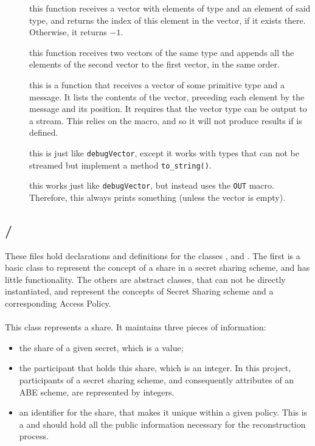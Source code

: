 \documentclass{article}
\begin{document}
\begin{description}
\item[] this function receives a vector with elements of type  and an element of said type, and returns the index of this element in the vector, if it exists there. Otherwise, it returns $-1$.
\item[] this function receives two vectors of the same type and appends all the elements of the second vector to the first vector, in the same order.
\item[] this is a function that receives a vector of some primitive type and a \cstring message. It lists the contents of the vector, preceding each element by the message and its position. It requires that the vector type can be output to a stream. This relies on the  macro, and so it will not produce results if  is defined.
\item[] this is just like \verb|debugVector|, except it works with types that can not be streamed but implement a method \verb|to_string()|. 
\item[] this works just like \verb|debugVector|, but instead uses the \verb|OUT| macro. Therefore, this always prints something (unless the vector is empty).
\end{description}

\subsection{\fhss / \fcss}

These files hold declarations and definitions for the classes \cST, \cAP and \cSS. The first is a basic class to represent the concept of a share in a secret sharing scheme, and has little functionality. The others are abstract classes, that can not be directly instantiated, and represent the concepts of Secret Sharing scheme and a corresponding Access Policy.

\paragraph{\cST}

This class represents a share. It maintains three pieces of information: 
\begin{itemize}
\item the share of a given secret, which is a \cBig value;
\item the participant that holds this share, which is an integer. In this project, participants of a secret sharing scheme, and consequently attributes of an ABE scheme, are represented by integers.
\item an identifier for the share, that makes it unique within a given policy. This is a \cstring and should hold all the public information necessary for the reconstruction process.
\end{itemize}
\end{document}
